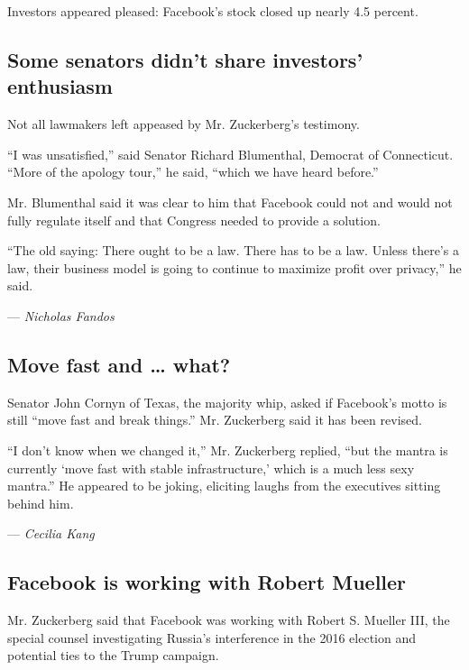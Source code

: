 Investors appeared pleased: Facebook's stock closed up nearly 4.5
percent.

\hypertarget{some-senators-didnt-share-investors-enthusiasm}{%
\subsection{Some senators didn't share investors'
enthusiasm}\label{some-senators-didnt-share-investors-enthusiasm}}

Not all lawmakers left appeased by Mr. Zuckerberg's testimony.

``I was unsatisfied,'' said Senator Richard Blumenthal, Democrat of
Connecticut. ``More of the apology tour,'' he said, ``which we have
heard before.''

Mr. Blumenthal said it was clear to him that Facebook could not and
would not fully regulate itself and that Congress needed to provide a
solution.

``The old saying: There ought to be a law. There has to be a law. Unless
there's a law, their business model is going to continue to maximize
profit over privacy,'' he said.

--- \emph{Nicholas Fandos}

\hypertarget{move-fast-and--what}{%
\subsection{Move fast and \ldots{} what?}\label{move-fast-and--what}}

Senator John Cornyn of Texas, the majority whip, asked if Facebook's
motto is still ``move fast and break things.'' Mr. Zuckerberg said it
has been revised.

``I don't know when we changed it,'' Mr. Zuckerberg replied, ``but the
mantra is currently `move fast with stable infrastructure,' which is a
much less sexy mantra.'' He appeared to be joking, eliciting laughs from
the executives sitting behind him.

--- \emph{Cecilia Kang}

\hypertarget{facebook-is-working-with-robert-mueller}{%
\subsection{Facebook is working with Robert
Mueller}\label{facebook-is-working-with-robert-mueller}}

Mr. Zuckerberg said that Facebook was working with Robert S. Mueller
III, the special counsel investigating Russia's interference in the 2016
election and potential ties to the Trump campaign.

